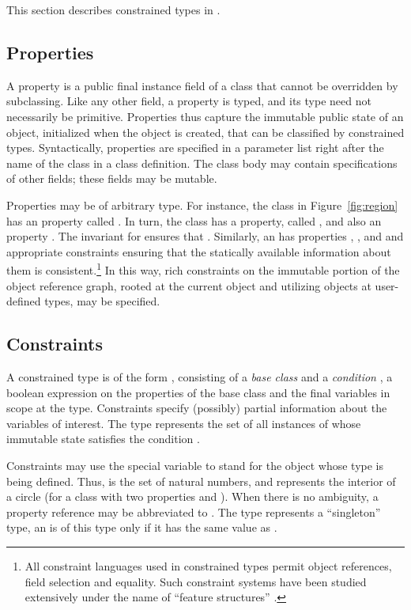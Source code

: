 This section describes constrained types in \Xten{}.

\subsection{Properties}

A property is a public final instance field of a
class that cannot be overridden by subclassing. Like any other field,
a property is typed, and its type need not necessarily be
primitive. Properties thus capture the immutable public state of an
object, initialized when the object is created, that can be
classified by constrained types. Syntactically, properties are
specified in a parameter list right after the name of the class in a
class definition. The class body may contain specifications of other
fields; these fields may be mutable.

Properties may be of arbitrary type. For instance, the class
 in Figure~\ref{fig:region} has an  property called . In turn, the
class  has a  property, called , and
also an  property .  The invariant for 
ensures that . Similarly, an  has
properties , , and 
and appropriate constraints ensuring that the statically available
information about them is consistent.\footnote{All constraint
languages used in constrained types permit object references, field
selection and equality. Such constraint systems have been studied
extensively under the name of ``feature structures''
\cite{feature-structures}.}
%
In this way, rich  
constraints on the immutable portion of
the object reference graph, rooted at the current object and utilizing
objects at user-defined types, may be specified.

\subsection{Constraints}
A constrained type is of the form , consisting of a
{\em base class}  and a {\em condition} , a
boolean expression on the properties of the base class and the
final variables in scope at the type.  Constraints specify
(possibly) partial information about the variables of interest.
The type  represents the set of all
instances of  whose immutable state satisfies the
condition .

Constraints may use the special variable  to stand for
the object whose type is being defined. Thus,  is
the set of natural numbers, and 
represents the interior of a circle (for a class  with two
 properties  and ). When there is no
ambiguity, a property reference  may be abbreviated
to . The type  represents a ``singleton'' type, an
 is of this type only if it has the same value as .

